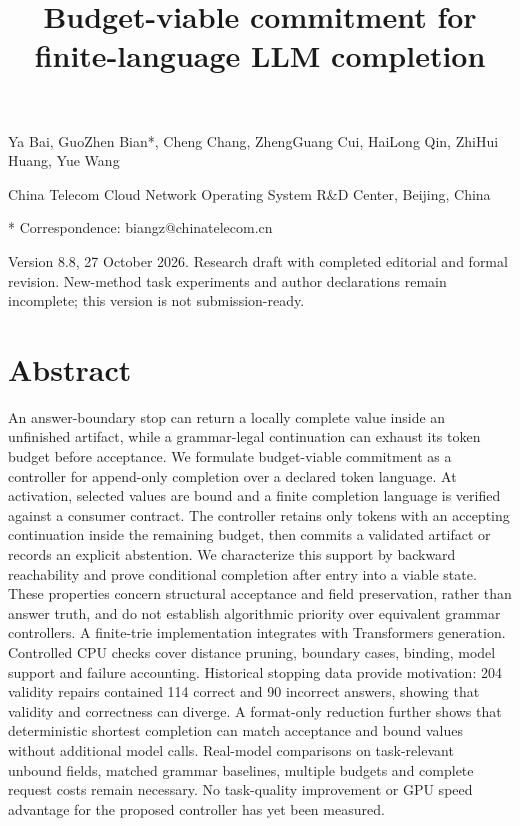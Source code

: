 \documentclass[
  12pt,
  a4paper,
]{article}
\title{Budget-viable commitment for finite-language LLM completion}
\author{}
\date{}
\begin{document}
\maketitle

Ya Bai, GuoZhen Bian*, Cheng Chang, ZhengGuang Cui, HaiLong Qin, ZhiHui
Huang, Yue Wang

China Telecom Cloud Network Operating System R\&D Center, Beijing, China

* Correspondence: biangz@chinatelecom.cn

Version 8.8, 27 October 2026. Research draft with completed editorial
and formal revision. New-method task experiments and author declarations
remain incomplete; this version is not submission-ready.

\section{Abstract}\label{abstract}

An answer-boundary stop can return a locally complete value inside an
unfinished artifact, while a grammar-legal continuation can exhaust its
token budget before acceptance. We formulate budget-viable commitment as
a controller for append-only completion over a declared token language.
At activation, selected values are bound and a finite completion
language is verified against a consumer contract. The controller retains
only tokens with an accepting continuation inside the remaining budget,
then commits a validated artifact or records an explicit abstention. We
characterize this support by backward reachability and prove conditional
completion after entry into a viable state. These properties concern
structural acceptance and field preservation, rather than answer truth,
and do not establish algorithmic priority over equivalent grammar
controllers. A finite-trie implementation integrates with Transformers
generation. Controlled CPU checks cover distance pruning, boundary
cases, binding, model support and failure accounting. Historical
stopping data provide motivation: 204 validity repairs contained 114
correct and 90 incorrect answers, showing that validity and correctness
can diverge. A format-only reduction further shows that deterministic
shortest completion can match acceptance and bound values without
additional model calls. Real-model comparisons on task-relevant unbound
fields, matched grammar baselines, multiple budgets and complete request
costs remain necessary. No task-quality improvement or GPU speed
advantage for the proposed controller has yet been measured.
\end{document}
